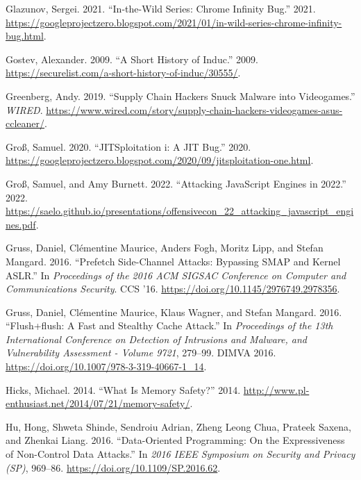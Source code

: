\documentclass[
  a4paper,
]{report}
\newlength{\cslhangindent}
\newlength{\cslentryspacingunit} %
\newenvironment{CSLReferences}[2] %
 {%
  \setlength{\parindent}{0pt}
  \ifodd #1
  \let\oldpar\par
  \def\par{\hangindent=\cslhangindent\oldpar}
  \fi
  \setlength{\parskip}{#2\cslentryspacingunit}
 }%
 {}
\begin{document}
\begin{CSLReferences}{1}{0}
\leavevmode{}%
Glazunov, Sergei. 2021. {``In-the-Wild Series: Chrome Infinity Bug.''}
2021.
\url{https://googleprojectzero.blogspot.com/2021/01/in-wild-series-chrome-infinity-bug.html}.

\leavevmode{}%
Gostev, Alexander. 2009. {``A Short History of Induc.''} 2009.
\url{https://securelist.com/a-short-history-of-induc/30555/}.

\leavevmode{}%
Greenberg, Andy. 2019. {``Supply Chain Hackers Snuck Malware into
Videogames.''} \emph{WIRED}.
\url{https://www.wired.com/story/supply-chain-hackers-videogames-asus-ccleaner/}.

\leavevmode{}%
Groß, Samuel. 2020. {``JITSploitation i: A JIT Bug.''} 2020.
\url{https://googleprojectzero.blogspot.com/2020/09/jitsploitation-one.html}.

\leavevmode{}%
Groß, Samuel, and Amy Burnett. 2022. {``Attacking JavaScript Engines in
2022.''} 2022.
\url{https://saelo.github.io/presentations/offensivecon_22_attacking_javascript_engines.pdf}.

\leavevmode{}%
Gruss, Daniel, Clémentine Maurice, Anders Fogh, Moritz Lipp, and Stefan
Mangard. 2016. {``Prefetch Side-Channel Attacks: Bypassing SMAP and
Kernel ASLR.''} In \emph{Proceedings of the 2016 ACM SIGSAC Conference
on Computer and Communications Security}. CCS '16.
\url{https://doi.org/10.1145/2976749.2978356}.

\leavevmode{}%
Gruss, Daniel, Clémentine Maurice, Klaus Wagner, and Stefan Mangard.
2016. {``Flush+flush: A Fast and Stealthy Cache Attack.''} In
\emph{Proceedings of the 13th International Conference on Detection of
Intrusions and Malware, and Vulnerability Assessment - Volume 9721},
279--99. DIMVA 2016. \url{https://doi.org/10.1007/978-3-319-40667-1_14}.

\leavevmode{}%
Hicks, Michael. 2014. {``What Is Memory Safety?''} 2014.
\url{http://www.pl-enthusiast.net/2014/07/21/memory-safety/}.

\leavevmode{}%
Hu, Hong, Shweta Shinde, Sendroiu Adrian, Zheng Leong Chua, Prateek
Saxena, and Zhenkai Liang. 2016. {``Data-Oriented Programming: On the
Expressiveness of Non-Control Data Attacks.''} In \emph{2016 IEEE
Symposium on Security and Privacy (SP)}, 969--86.
\url{https://doi.org/10.1109/SP.2016.62}.


\end{CSLReferences}
\end{document}
